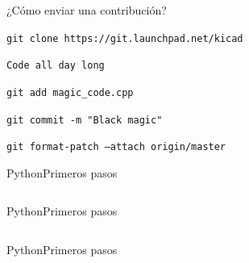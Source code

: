 
\begin{frame}{¿Cómo enviar una contribución?}
		\begin{center}
		\begin{minipage}{0.8\textwidth}
			\begin{fullpageitemize}
				\item[\faCode] \texttt{git clone https://git.launchpad.net/kicad} \\
				\pause
				\item[\faCode] \texttt{Code all day long} \\
				\pause
				\item[\faCode] \texttt{git add magic_code.cpp} \\
				\pause
				\item[\faCode] \texttt{git commit -m "Black magic"} \\
				\pause
				\item[\faCode] \texttt{git format-patch --attach origin/master}
			\end{fullpageitemize}
		\end{minipage}
	\end{center}	
\end{frame}



\begin{frame}{Python}{Primeros pasos}
	  \begin{center}
		\begin{minipage}{0.8\textwidth}
			\inputminted[fontsize=\Large]{python}{code/python/start.py}
		\end{minipage}
	\end{center}
\end{frame}

\begin{frame}{Python}{Primeros pasos}
	\inputminted[fontsize=\large]{python}{code/python/nets.py}
\end{frame}

\begin{frame}{Python}{Primeros pasos}
\begin{center}
	\begin{minipage}{0.9\textwidth}
		\inputminted[fontsize=\large]{python}{code/python/nets2.py}
	\end{minipage}
\end{center}
\end{frame}
